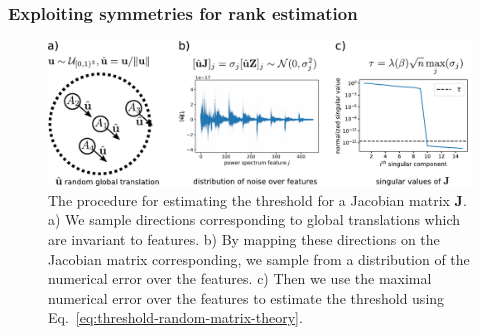 \subsubsection{Exploiting symmetries for rank estimation}
\begin{figure}
    \centering
    \includegraphics[width=\textwidth]{fig/random_global_translation.pdf}
    \caption{
      The procedure for estimating the threshold for a Jacobian matrix $\mathbf{J}$. a) We sample directions corresponding to global translations which are invariant to features. b) By mapping these directions on the Jacobian matrix corresponding, we sample from a distribution of the numerical error over the features. c) Then we use the maximal numerical error over the features to estimate the threshold using Eq.~\ref{eq:threshold-random-matrix-theory}.}
    \label{fig:threshold-estimation}
\end{figure}

